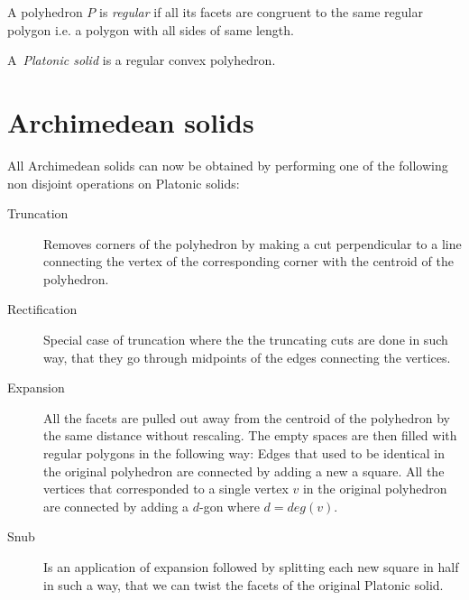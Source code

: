\begin{redtext}
\begin{define}
A polyhedron $P$ is {\sl regular} if all its facets are congruent to the same regular polygon i.e. a polygon with all sides of same length.
\end{define}

\begin{define}
A~{\sl Platonic solid} is a regular convex polyhedron.
\end{define}

\section{Archimedean solids}

All Archimedean solids can now be obtained by performing one of the following non disjoint operations on Platonic solids:

\begin{description}
    \item[Truncation] Removes corners of the polyhedron by making a cut perpendicular to a line connecting the vertex of the corresponding corner with the centroid of the polyhedron.
    \item[Rectification] Special case of truncation where the the truncating cuts are done in such way, that they go through midpoints of the edges connecting the vertices. 
    \item[Expansion] All the facets are pulled out away from the centroid of the polyhedron by the same distance without rescaling. The empty spaces are then filled with regular polygons in the following way: Edges that used to be identical in the original polyhedron are connected by adding a new a square. All the vertices that corresponded to a single vertex $v$ in the original polyhedron are connected by adding a $d$-gon where $d=deg(v)$.   
    \item[Snub] Is an application of expansion followed by splitting each new square in half in such a way, that we can twist the facets of the original Platonic solid.

\end{description}

\end{redtext}

